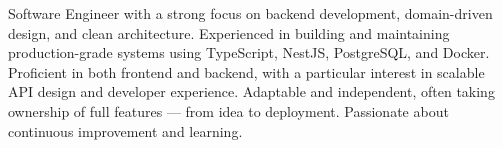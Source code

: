 

\begin{cvparagraph}

Software Engineer with a strong focus on backend development, domain-driven design, and clean architecture. Experienced in building and maintaining production-grade systems using TypeScript, NestJS, PostgreSQL, and Docker. Proficient in both frontend and backend, with a particular interest in scalable API design and developer experience. Adaptable and independent, often taking ownership of full features — from idea to deployment. Passionate about continuous improvement and learning.
\end{cvparagraph}
